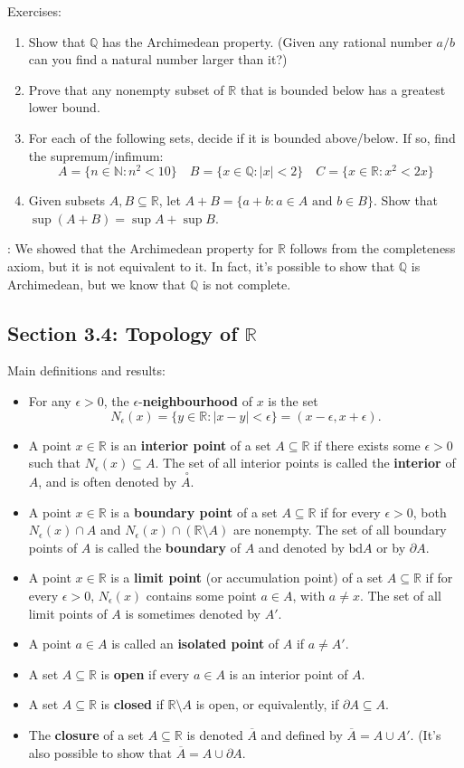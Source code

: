 \documentclass[letterpaper,12pt]{article}
\newcommand{\N}{\mathbb{N}}
\newcommand{\Q}{\mathbb{Q}}
\newcommand{\R}{\mathbb{R}}
\newcommand{\abs}[1]{\lvert #1\rvert}
\begin{document}
\noindent Exercises:
\begin{enumerate}
 \item Show that $\Q$ has the Archimedean property. (Given any rational number $a/b$ can you find a natural number larger than it?)
 \item Prove that any nonempty subset of $\R$ that is bounded below has a greatest lower bound.
 \item For each of the following sets, decide if it is bounded above/below. If so, find the supremum/infimum:
\[
 A = \{n\in\N : n^2<10\}\quad B = \{x\in\Q : \abs{x}<2\}\quad C = \{x\in\R : x^2<2x\}
\]
 \item Given subsets $A,B\subseteq \R$, let $A+B = \{a+b:a\in A \text{ and } b\in B\}$. Show that $\sup(A+B) = \sup A+\sup B$.
\end{enumerate}
: We showed that the Archimedean property for $\R$ follows from the completeness axiom, but it is not equivalent to it. In fact, it's possible to show that $\Q$ is Archimedean, but we know that $\Q$ is not complete.

\subsection*{Section 3.4: Topology of $\R$}
Main definitions and results:
\begin{itemize}
 \item For any $\epsilon>0$, the $\epsilon$-{\bf neighbourhood} of $x$ is the set
\[
 N_\epsilon(x) = \{y\in\R : \abs{x-y}<\epsilon\} = (x-\epsilon,x+\epsilon).
\]
 \item A point $x\in \R$ is an {\bf interior point} of a set $A\subseteq \R$ if there exists some $\epsilon>0$ such that $N_\epsilon(x)\subseteq A$. The set of all interior points is called the {\bf interior} of $A$, and is often denoted by $\overset{\,\,\circ}{A}$.
 \item A point $x\in \R$ is a {\bf boundary point} of a set $A\subseteq \R$ if for every $\epsilon>0$, both $N_\epsilon(x)\cap A$ and $N_\epsilon(x)\cap(\R\setminus A)$ are nonempty. The set of all boundary points of $A$ is called the {\bf boundary} of $A$ and denoted by $\mathrm{bd} A$ or by $\partial A$.
 \item A point $x\in \R$ is a {\bf limit point} (or accumulation point) of a set $A\subseteq \R$ if for every $\epsilon>0$, $N_\epsilon(x)$ contains some point $a\in A$, with $a\neq x$. The set of all limit points of $A$ is sometimes denoted by $A'$.
 \item A point $a\in A$ is called an {\bf isolated point} of $A$ if $a\neq A'$.
 \item A set $A\subseteq \R$ is {\bf open} if every $a\in A$ is an interior point of $A$.
 \item A set $A\subseteq \R$ is {\bf closed} if $\R\setminus A$ is open, or equivalently, if $\partial A\subseteq A$.
 \item The {\bf closure} of a set $A\subseteq \R$ is denoted $\overline{A}$ and defined by $\overline{A} = A\cup A'$. (It's also possible to show that $\overline{A} = A\cup\partial A$.
\end{itemize}
\end{document}
